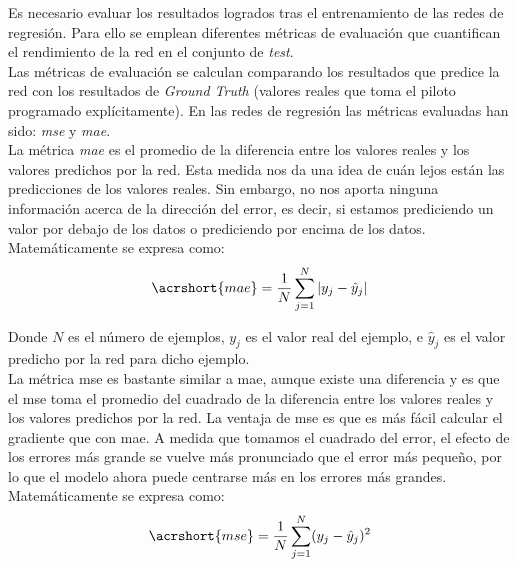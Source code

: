 Es necesario evaluar los resultados logrados tras el entrenamiento de las redes de regresión. Para ello se emplean diferentes métricas de evaluación que cuantifican el rendimiento de la red en el conjunto de \textit{test}.\\

Las métricas de evaluación se calculan comparando los resultados que predice la red con los resultados de \textit{Ground Truth} (valores reales que toma el piloto programado explícitamente). En las redes de regresión las métricas evaluadas han sido: \textit{\acrfull{mse}} y \textit{\acrfull{mae}}. \\

La métrica \textit{\acrfull{mae}} es el promedio de la diferencia entre los valores reales y los valores predichos por la red. Esta medida nos da una idea de cuán lejos están las predicciones de los valores reales. Sin embargo, no nos aporta ninguna información acerca de la dirección del error, es decir, si estamos prediciendo un valor por debajo de los datos o prediciendo por encima de los datos. Matemáticamente se expresa como:\\

\begin{equation}\label{eq:mae_reg}
    \acrshort{mae} = \frac{1}{N}\sum_{j=1}^{N}|y_j - \hat{y}_j|
\end{equation}
\vspace{10pt}

Donde \(N\) es el número de ejemplos, \(y_j\) es el valor real del ejemplo, e \(\hat{y}_j\) es el valor predicho por la red para dicho ejemplo.\\

La métrica \acrfull{mse} es bastante similar a \acrfull{mae}, aunque existe una diferencia y es que el \acrshort{mse} toma el promedio del cuadrado de la diferencia entre los valores reales y los valores predichos por la red. La ventaja de \acrshort{mse} es que es más fácil calcular el gradiente que con \acrshort{mae}. A medida que tomamos el cuadrado del error, el efecto de los errores más grande se vuelve más pronunciado que el error más pequeño, por lo que el modelo ahora puede centrarse más en los errores más grandes. Matemáticamente se expresa como:\\

\begin{equation}\label{eq:mse_reg}
    \acrshort{mse} = \frac{1}{N}\sum_{j=1}^{N}(y_j - \hat{y}_j)^2
\end{equation}
\vspace{10pt}

